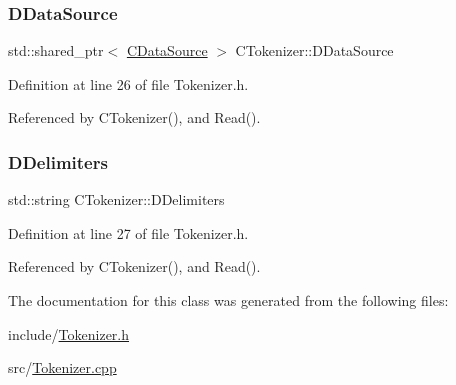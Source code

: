 \subsubsection{\texorpdfstring{D\+Data\+Source}{DDataSource}}
{\footnotesize\ttfamily std\+::shared\+\_\+ptr$<$ \hyperlink{classCDataSource}{C\+Data\+Source} $>$ C\+Tokenizer\+::\+D\+Data\+Source\hspace{0.3cm}{\ttfamily [protected]}}



Definition at line 26 of file Tokenizer.\+h.



Referenced by C\+Tokenizer(), and Read().

\hypertarget{classCTokenizer_ad1edcf297f5f9ccf43dc32a992556f52}{}\label{classCTokenizer_ad1edcf297f5f9ccf43dc32a992556f52} 
\subsubsection{\texorpdfstring{D\+Delimiters}{DDelimiters}}
{\footnotesize\ttfamily std\+::string C\+Tokenizer\+::\+D\+Delimiters\hspace{0.3cm}{\ttfamily [protected]}}



Definition at line 27 of file Tokenizer.\+h.



Referenced by C\+Tokenizer(), and Read().



The documentation for this class was generated from the following files\+:\begin{DoxyCompactItemize}
\item 
include/\hyperlink{Tokenizer_8h}{Tokenizer.\+h}\item 
src/\hyperlink{Tokenizer_8cpp}{Tokenizer.\+cpp}\end{DoxyCompactItemize}
